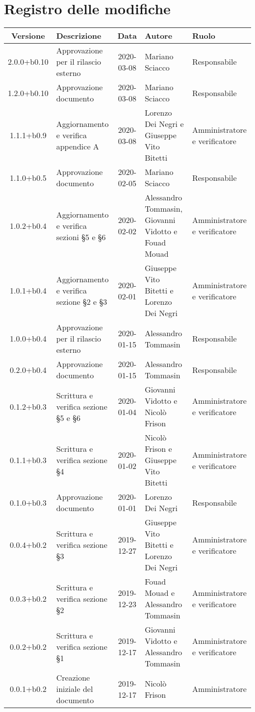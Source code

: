 \section*{Registro delle modifiche}

\begin{center}
	\begin{longtable}{|c|p{3.5cm}|c|p{3cm}|p{3cm}|}
	\hline
	\rowcolor{lighter-grayer}
	\textbf{Versione} & \textbf{Descrizione} & \textbf{Data} & \textbf{Autore} & \textbf{Ruolo} \\
	\hline
	\endfirsthead

	2.0.0+b0.10 & Approvazione per il rilascio esterno  & 2020-03-08 & Mariano Sciacco & Responsabile \\
	\hline
	1.2.0+b0.10 & Approvazione documento & 2020-03-08 & Mariano Sciacco & Responsabile \\
	\hline
	1.1.1+b0.9 & Aggiornamento e verifica appendice A  & 2020-03-08 & Lorenzo Dei Negri e Giuseppe Vito Bitetti & Amministratore e verificatore \\
	\hline
	1.1.0+b0.5 & Approvazione documento & 2020-02-05 & Mariano Sciacco & Responsabile \\
	\hline
	1.0.2+b0.4 & Aggiornamento e verifica sezioni \S5 e \S6  & 2020-02-02 & Alessandro Tommasin, Giovanni Vidotto e Fouad Mouad & Amministratore e verificatore \\
	\hline
	1.0.1+b0.4 & Aggiornamento e verifica sezione \S2 e \S3  & 2020-02-01 & Giuseppe Vito Bitetti e Lorenzo Dei Negri & Amministratore e verificatore \\
	\hline
	1.0.0+b0.4 & Approvazione per il rilascio esterno & 2020-01-15 & Alessandro Tommasin & Responsabile \\
	\hline
	0.2.0+b0.4 & Approvazione documento & 2020-01-15 & Alessandro Tommasin & Responsabile \\
	\hline
	0.1.2+b0.3 & Scrittura e verifica sezione \S5 e \S6 & 2020-01-04 & Giovanni Vidotto e Nicolò Frison & Amministratore e verificatore \\
	\hline
	0.1.1+b0.3 &  Scrittura e verifica sezione \S4 & 2020-01-02 & Nicolò Frison e Giuseppe Vito Bitetti & Amministratore e verificatore \\
	\hline
	0.1.0+b0.3 & Approvazione documento & 2020-01-01 & Lorenzo Dei Negri & Responsabile \\
	\hline
	0.0.4+b0.2 & Scrittura e verifica sezione \S3 & 2019-12-27  & Giuseppe Vito Bitetti e Lorenzo Dei Negri & Amministratore e verificatore \\
	\hline
	0.0.3+b0.2 & Scrittura e verifica sezione \S2 & 2019-12-23 & Fouad Mouad e Alessandro Tommasin & Amministratore e verificatore \\
	\hline
	0.0.2+b0.2 & Scrittura e verifica sezione \S1 & 2019-12-17 & Giovanni Vidotto e Alessandro Tommasin & Amministratore e verificatore \\
	\hline
	0.0.1+b0.2 & Creazione iniziale del documento & 2019-12-17 & Nicolò Frison & Amministratore \\
	\hline

	\end{longtable}
\end{center}
